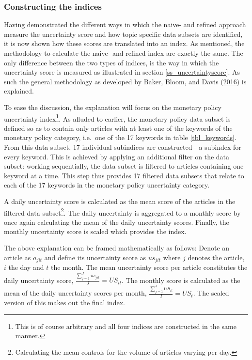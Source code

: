 \documentclass[11pt,preprint, authoryear]{elsarticle}
\numberwithin{equation}{section}
\numberwithin{figure}{section}
\numberwithin{table}{section}
\let\rmarkdownfootnote\footnote%
\def\footnote{\protect\rmarkdownfootnote}
\begin{document}
\subsubsection{\texorpdfstring{Constructing the indices
\label{ss_indices}}{Constructing the indices }}\label{constructing-the-indices}

Having demonstrated the different ways in which the naive- and refined
approach measure the uncertainty score and how topic specific data
subsets are identified, it is now shown how these scores are translated
into an index. As mentioned, the methodology to calculate the naive- and
refined index are exactly the same. The only difference between the two
types of indices, is the way in which the uncertainty score is measured
as illustrated in section \ref{ss_uncertaintyscore}. As such the general
methodology as developed by Baker, Bloom, and Davis
(\protect\hyperlink{ref-Baker2016}{2016}) is explained.

To ease the discussion, the explanation will focus on the monetary
policy uncertainty index\footnote{This is of course arbitrary and all
  four indices are constructed in the same manner.}. As alluded to
earlier, the monetary policy data subset is defined so as to contain
only articles with at least one of the keywords of the monetary policy
category, i.e.~one of the 17 keywords in table \ref{tbl_keywords}. From
this data subset, 17 individual subindices are constructed - a subindex
for every keyword. This is achieved by applying an additional filter on
the data subset: working sequentially, the data subset is filtered to
articles containing one keyword at a time. This step thus provides 17
filtered data subsets that relate to each of the 17 keywords in the
monetary policy uncertainty category.

A daily uncertainty score is calculated as the mean score of the
articles in the filtered data subset\footnote{Calculating the mean
  controls for the volume of articles varying per day.}. The daily
uncertainty is aggregated to a monthly score by once again calculating
the mean of the daily uncertainty scores. Finally, the monthly
uncertainty score is scaled which provides the index.

The above explanation can be framed mathematically as follows: Denote an
article as \(a_{jit}\) and define its uncertainty score as \(us_{jit}\)
where \(j\) denotes the article, \(i\) the day and \(t\) the month. The
mean uncertainty score per article constitutes the daily uncertainty
score, \(\frac{\sum_{j=1}^Jus_{jit}}{J}= US_{it}\). The monthly score is
calculated as the mean of the daily uncertainty scores per month,
\(\frac{\sum_{j=1}^JUS_{it}}{I}= US_{t}\). The scaled version of this
makes out the final index.
\end{document}
